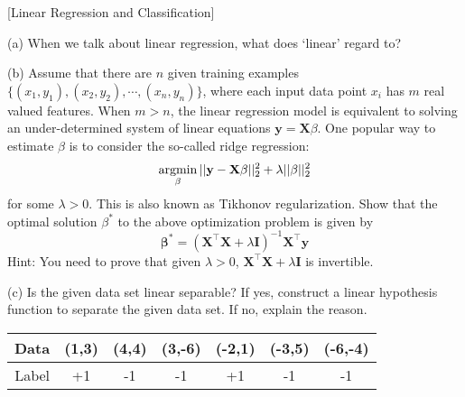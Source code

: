 \item {} [Linear Regression and Classification]

(a) When we talk about linear regression, what does `linear' regard to? 

(b) Assume that there are $n$ given training examples $\{(x_1, y_1), (x_2, y_2), \cdots, (x_n, y_n)\}$, where each input data point $x_i$ has $m$ real valued features. When $m > n$, the linear regression model is equivalent to solving an under-determined system of linear equations $\mathbf{y} = \mathbf{X}\beta$. One popular way to estimate $\beta$ is to consider the so-called ridge regression:
$$\mathop{\rm argmin}_{\beta} ||\mathbf{y}-\mathbf{X}\mathbf{\beta}||_2^2 + \lambda||\beta||_2^2$$
for some $\lambda > 0$. This is also known as Tikhonov regularization. Show that the optimal solution $\beta^*$ to the above optimization problem is given by
$$\mathbf{\beta}^* = (\mathbf{X}^{\top}\mathbf{X} + \lambda \mathbf{I})^{-1}\mathbf{X}^{\top}\mathbf{y}$$
Hint: You need to prove that given $\lambda>0$, $\mathbf{X}^{\top}\mathbf{X} + \lambda \mathbf{I}$ is invertible. 

(c) Is the given data set linear separable? If yes, construct a linear hypothesis function to separate the given data set. If no, explain the reason. 
\begin{table}[h]
    \centering
    \begin{tabular}{c|cccccc}
        Data & (1,3) & (4,4) & (3,-6) & (-2,1) & (-3,5) & (-6,-4) \\ \hline
        Label & +1 & -1 & -1 & +1 & -1 & -1
    \end{tabular}
    \label{tab:my_label}
\end{table}

\solution









\newpage